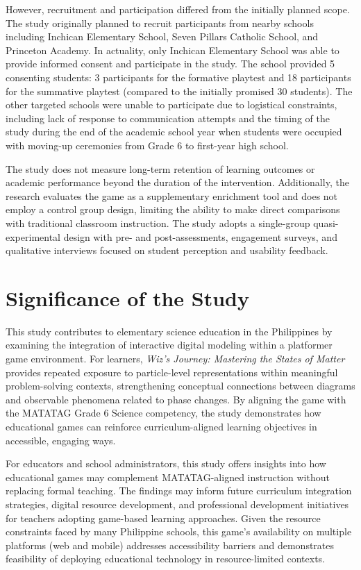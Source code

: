 However, recruitment and participation differed from the initially planned scope. The study originally planned to recruit participants from nearby schools including Inchican Elementary School, Seven Pillars Catholic School, and Princeton Academy. In actuality, only Inchican Elementary School was able to provide informed consent and participate in the study. The school provided 5 consenting students: 3 participants for the formative playtest and 18 participants for the summative playtest (compared to the initially promised 30 students). The other targeted schools were unable to participate due to logistical constraints, including lack of response to communication attempts and the timing of the study during the end of the academic school year when students were occupied with moving-up ceremonies from Grade 6 to first-year high school.

The study does not measure long-term retention of learning outcomes or academic performance beyond the duration of the intervention. Additionally, the research evaluates the game as a supplementary enrichment tool and does not employ a control group design, limiting the ability to make direct comparisons with traditional classroom instruction. The study adopts a single-group quasi-experimental design with pre- and post-assessments, engagement surveys, and qualitative interviews focused on student perception and usability feedback.


\section{Significance of the Study}

This study contributes to elementary science education in the Philippines by examining the integration of interactive digital modeling within a platformer game environment. For learners, \textit{Wiz's Journey: Mastering the States of Matter} provides repeated exposure to particle-level representations within meaningful problem-solving contexts, strengthening conceptual connections between diagrams and observable phenomena related to phase changes. By aligning the game with the MATATAG Grade 6 Science competency, the study demonstrates how educational games can reinforce curriculum-aligned learning objectives in accessible, engaging ways.

For educators and school administrators, this study offers insights into how educational games may complement MATATAG-aligned instruction without replacing formal teaching. The findings may inform future curriculum integration strategies, digital resource development, and professional development initiatives for teachers adopting game-based learning approaches. Given the resource constraints faced by many Philippine schools, this game's availability on multiple platforms (web and mobile) addresses accessibility barriers and demonstrates feasibility of deploying educational technology in resource-limited contexts.

